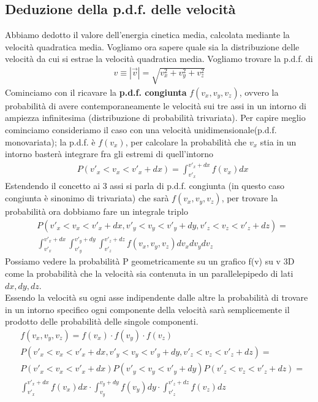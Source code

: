 \documentclass[10pt,a4paper]{article}
\begin{document}
\subsection{Deduzione della p.d.f. delle velocità}
Abbiamo dedotto il valore dell'energia cinetica media, calcolata mediante la velocità quadratica media. Vogliamo ora sapere quale sia la distribuzione delle velocità da cui si estrae la velocità quadratica media. Vogliamo trovare la p.d.f. di
\begin{align*} 
	v \equiv |\vec{v}| = \sqrt{v_x^2+v_y^2+v_z^2}
\end{align*} 
Cominciamo con il ricavare la \textbf{p.d.f. congiunta} $f(v_x, v_y, v_z)$, ovvero la probabilità di avere contemporaneamente le velocità sui tre assi in un intorno di ampiezza infinitesima (distribuzione di probabilità trivariata). Per capire meglio cominciamo consideriamo il caso con una velocità unidimensionale(p.d.f. monovariata); la p.d.f. è $f(v_x)$, per calcolare la probabilità che $v_x$ stia in un intorno basterà integrare fra gli estremi di quell'intorno
\begin{align*} 
	& P(v'_x<v_x<v'_x+dx)= \int_{v'_x}^{v'_x+dx}f(v_x)dx
\end{align*} 
Estendendo il concetto ai 3 assi si parla di p.d.f. congiunta (in questo caso congiunta è sinonimo di trivariata) che sarà $f(v_x, v_y, v_z)$, per trovare la probabilità ora dobbiamo fare un integrale triplo
\begin{align*} 
	&P(v'_x<v_x<v'_x+dx, v'_y<v_y<v'_y+dy, v'_z<v_z<v'_z+dz) =\\
	&\int_{v'_x}^{v'_x+dx}\int_{v'_y}^{v'_y+dy}\int_{v'_z}^{v'_z+dz} f(v_x,v_y,v_z) dv_xdv_ydv_z
\end{align*} 
Possiamo vedere la probabilità P geometricamente su un grafico f(v) su v 3D come la probabilità che la velocità sia contenuta in un parallelepipedo di lati $dx, dy, dz$.\\
Essendo la velocità su ogni asse indipendente dalle altre la probabilità di trovare in un intorno specifico ogni componente della velocità sarà semplicemente il prodotto delle probabilità delle singole componenti.
\begin{align}\label{eq:cond1}
	&f(v_x, v_y, v_z) = f(v_x)\cdot f(v_y)\cdot f(v_z)\\
	& P(v'_x<v_x<v'_x+dx, v'_y<v_y<v'_y+dy, v'_z<v_z<v'_z+dz) =\nonumber\\ 
	&P(v'_x<v_x<v'_x+dx) P(v'_y<v_y<v'_y+dy) P(v'_z<v_z<v'_z+dz)=\nonumber\\
	&\int_{v'_x}^{v'_x+dx} f(v_x)dx \cdot \int_{v_y}^{v_y+dy}f(v_y)dy \cdot \int_{v'_z}^{v'_z+dz}f(v_z)dz\nonumber
\end{align} 
\end{document}
